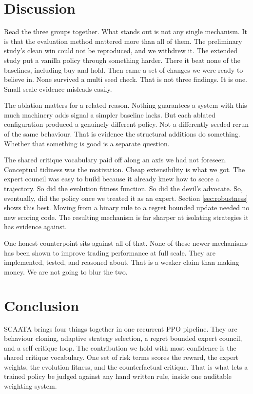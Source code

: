 \documentclass[conference]{IEEEtran}
\begin{document}
\section{Discussion}

Read the three groups together. What stands out is not any single mechanism. It is that the evaluation method mattered more than all of them. The preliminary study's clean win could not be reproduced, and we withdrew it. The extended study put a vanilla policy through something harder. There it beat none of the baselines, including buy and hold. Then came a set of changes we were ready to believe in. None survived a multi seed check. That is not three findings. It is one. Small scale evidence misleads easily.

The ablation matters for a related reason. Nothing guarantees a system with this much machinery adds signal a simpler baseline lacks. But each ablated configuration produced a genuinely different policy. Not a differently seeded rerun of the same behaviour. That is evidence the structural additions do something. Whether that something is good is a separate question.

The shared critique vocabulary paid off along an axis we had not foreseen. Conceptual tidiness was the motivation. Cheap extensibility is what we got. The expert council was easy to build because it already knew how to score a trajectory. So did the evolution fitness function. So did the devil's advocate. So, eventually, did the policy once we treated it as an expert. Section \ref{sec:robustness} shows this best. Moving from a binary rule to a regret bounded update needed no new scoring code. The resulting mechanism is far sharper at isolating strategies it has evidence against.

One honest counterpoint sits against all of that. None of these newer mechanisms has been shown to improve trading performance at full scale. They are implemented, tested, and reasoned about. That is a weaker claim than making money. We are not going to blur the two.

\section{Conclusion}

SCAATA brings four things together in one recurrent PPO pipeline. They are behaviour cloning, adaptive strategy selection, a regret bounded expert council, and a self critique loop. The contribution we hold with most confidence is the shared critique vocabulary. One set of risk terms scores the reward, the expert weights, the evolution fitness, and the counterfactual critique. That is what lets a trained policy be judged against any hand written rule, inside one auditable weighting system.
\end{document}
